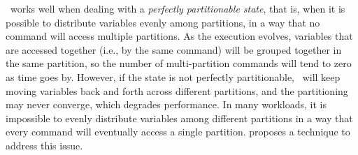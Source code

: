 \dssmr\ works well when dealing with a \emph{perfectly partitionable state}, that is, when it is possible to distribute variables evenly among partitions, in a way that no command will access multiple partitions.
As the execution evolves, variables that are accessed together (i.e., by the same command) will be grouped together in the same partition, so the number of multi-partition commands will tend to zero as time goes by.
However, if the state is not perfectly partitionable, \dssmr\ will keep moving variables back and forth across different partitions, and the partitioning may never converge, which degrades performance.
%
In many workloads, it is impossible to evenly distribute variables among different partitions in a way that every command will eventually access a single partition.
\dynastar proposes a technique to address this issue.



